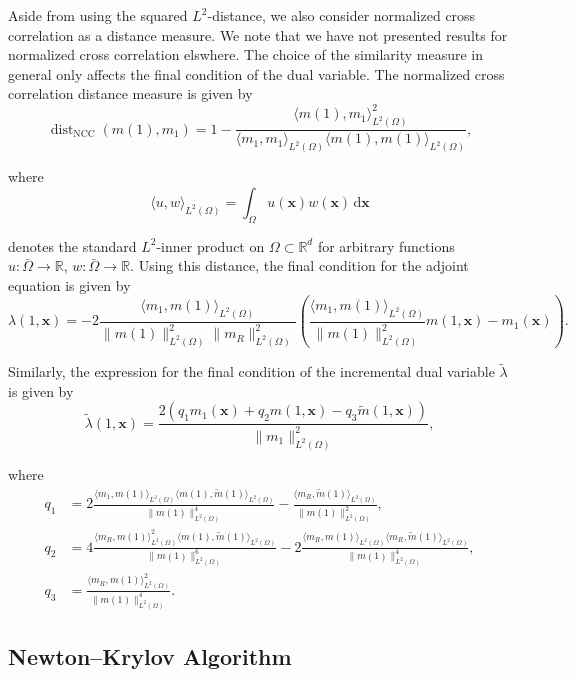 \documentclass[11pt]{amsart}
\renewcommand{\d}{\ensuremath{\text{d}}}
\renewcommand{\vec}[1]{\ensuremath{\boldsymbol{#1}}}
\begin{document}
Aside from using the squared $L^2$-distance, we also consider normalized cross correlation as a distance measure. We note that we have not presented results for normalized cross correlation elswhere. The choice of the similarity measure in general only affects the final condition of the dual variable. The normalized cross correlation distance measure is given by
\begin{equation}
\operatorname{dist}_{\text{NCC}} (m(1),m_1)
= 1 - \frac{\langle m(1), m_1 \rangle^2_{L^2(\Omega)}}
{\langle m_1, m_1 \rangle_{L^2(\Omega)}
\langle m(1), m(1) \rangle_{L^2(\Omega)}},
\end{equation}

\noindent where
\[
\langle u, w \rangle_{L^2(\Omega)} = \int_{\Omega} u(\vec{x}) w(\vec{x})\, \d \vec{x}
\]

\noindent denotes the standard $L^2$-inner product on $\Omega \subset \mathbb{R}^d$ for arbitrary functions $u : \bar{\Omega} \to \mathbb{R}$, $w : \bar{\Omega} \to \mathbb{R}$. Using this distance, the final condition for the adjoint equation is given by
\[
\lambda(1,\vec{x})
= -2\frac{\langle m_1,m(1)\rangle_{L^2(\Omega)}}{\|m(1)\|^2_{L^2(\Omega)} \|m_R\|^2_{L^2(\Omega)}}
\left(\frac{\langle m_1,m(1)\rangle_{L^2(\Omega)}}{\|m(1)\|^2_{L^2(\Omega)}}m(1,\vec{x}) - m_1(\vec{x})\right).
\]

Similarly, the expression for the final condition of the incremental dual variable $\tilde{\lambda}$ is given by
\[
\tilde{\lambda}(1,\vec{x})
= \frac{2(q_1 m_1(\vec{x}) + q_2 m(1,\vec{x}) - q_3 \tilde{m}(1,\vec{x}))}{\|m_1\|^2_{L^2(\Omega)}},
\]

\noindent where
\[
\begin{aligned}
q_1 &=
2\frac{\langle m_1, m(1)\rangle_{L^2(\Omega)}
\langle m(1), \tilde{m}(1)\rangle_{L^2(\Omega)}}{\|m(1)\|^4_{L^2(\Omega)}}
- \frac{\langle m_R, \tilde{m}(1)\rangle_{L^2(\Omega)}}{\|m(1)\|^2_{L^2(\Omega)}},
\\
q_2 & =
4\frac{\langle m_R,m(1)\rangle ^2_{L^2(\Omega)} \langle m(1),\tilde{m}(1) \rangle_{L^2(\Omega)}}{\|m(1)\|^6_{L^2(\Omega)}}
-2\frac{\langle m_R, m(1)\rangle_{L^2(\Omega)} \langle m_R, \tilde{m}(1)\rangle_{L^2(\Omega)}}{\|m(1)\|^4_{L^2(\Omega)}},
\\
q_3 &= \frac{\langle m_R, m(1)\rangle^2_{L^2(\Omega)}}{\|m(1)\|^4_{L^2(\Omega)}}.
\end{aligned}
\]




\subsection*{Newton--Krylov Algorithm}
\end{document}
